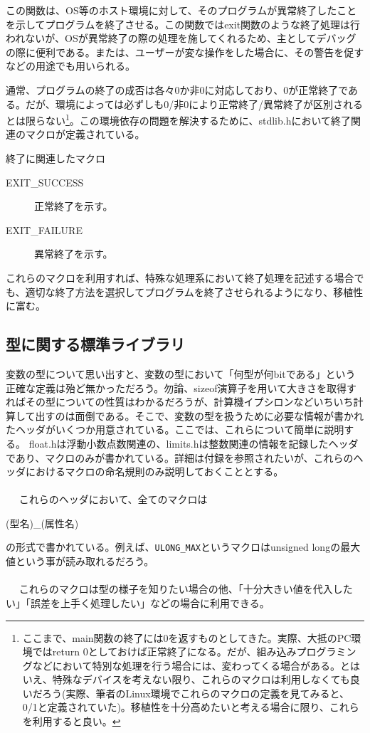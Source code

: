 この関数は、OS等のホスト環境に対して、そのプログラムが異常終了したことを示してプログラムを終了させる。この関数ではexit関数のような終了処理は行われないが、OSが異常終了の際の処理を施してくれるため、主としてデバッグの際に便利である。または、ユーザーが変な操作をした場合に、その警告を促すなどの用途でも用いられる。

通常、プログラムの終了の成否は各々0か非0に対応しており、0が正常終了である。だが、環境によっては必ずしも0/非0により正常終了/異常終了が区別されるとは限らない\footnote{ここまで、main関数の終了には0を返すものとしてきた。実際、大抵のPC環境ではreturn 0としておけば正常終了になる。だが、組み込みプログラミングなどにおいて特別な処理を行う場合には、変わってくる場合がある。とはいえ、特殊なデバイスを考えない限り、これらのマクロは利用しなくても良いだろう(実際、筆者のLinux環境でこれらのマクロの定義を見てみると、0/1と定義されていた)。移植性を十分高めたいと考える場合に限り、これらを利用すると良い。}。この環境依存の問題を解決するために、stdlib.hにおいて終了関連のマクロが定義されている。
\begin{itembox}[l]{終了に関連したマクロ}
\begin{description}
\item[EXIT\_SUCCESS] 正常終了を示す。
\item[EXIT\_FAILURE] 異常終了を示す。
\end{description}
\end{itembox}

これらのマクロを利用すれば、特殊な処理系において終了処理を記述する場合でも、適切な終了方法を選択してプログラムを終了させられるようになり、移植性に富む。

\subsection{型に関する標準ライブラリ}
変数の型について思い出すと、変数の型において「何型が何bitである」という正確な定義は殆ど無かっただろう。勿論、sizeof演算子を用いて大きさを取得すればその型についての性質はわかるだろうが、計算機イプシロンなどいちいち計算して出すのは面倒である。そこで、変数の型を扱うために必要な情報が書かれたヘッダがいくつか用意されている。ここでは、これらについて簡単に説明する。
float.hは浮動小数点数関連の、limits.hは整数関連の情報を記録したヘッダであり、マクロのみが書かれている。詳細は付録を参照されたいが、これらのヘッダにおけるマクロの命名規則のみ説明しておくこととする。
\\ \\　
これらのヘッダにおいて、全てのマクロは
\begin{code}
(型名)_(属性名)
\end{code}
の形式で書かれている。例えば、\verb|ULONG_MAX|というマクロはunsigned longの最大値という事が読み取れるだろう。
\\ \\　
これらのマクロは型の様子を知りたい場合の他、「十分大きい値を代入したい」「誤差を上手く処理したい」などの場合に利用できる。

